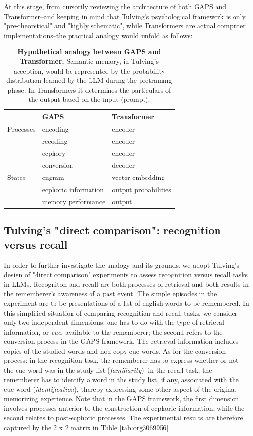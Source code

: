 \documentclass[11pt]{article}
\begin{document}
At this stage, from cursorily reviewing the architecture of both GAPS and Transformer--and keeping in mind that Tulving's psychological framework is only "pre-theoretical" and "highly schematic", while Transformers are actual computer implementations--the practical analogy would unfold as follows:

\begin{table}[htbp]
\caption{\label{tab:org3646b5e}\textbf{Hypothetical analogy between GAPS and Transformer.} Semantic memory, in Tulving's acception, would be represented by the probability distribution learned by the LLM during the pretraining phase. In Transformers it determines the particulars of the output based on the input (prompt).}
\centering
\begin{tabular}{lll}
 & GAPS & Transformer\\[0pt]
\hline
Processes & encoding & encoder\\[0pt]
 & recoding & encoder\\[0pt]
 & ecphory & encoder\\[0pt]
 & conversion & decoder\\[0pt]
\hline
States & engram & vector embedding\\[0pt]
 & ecphoric information & output probabilities\\[0pt]
 & memory performance & output\\[0pt]
\end{tabular}
\end{table}

\subsection*{Tulving's "direct comparison": recognition versus recall}
\label{sec:orgdc7f125}
In order to further investigate the analogy and its grounds, we adopt Tulving's design of "direct comparison" experiments to assess recognition versus recall tasks in LLMs. Recogniton and recall are both processes of retrieval and both results in the rememberer's awareness of a past event. The simple episodes in the experiment are to be presentations of a list of english words to be remembered. In this simplified situation of comparing recognition and recall tasks, we consider only two independent dimensions: one has to do with the type of retrieval information, or \emph{cue}, available to the rememberer; the second refers to the conversion process in the GAPS framework. The retrieval information includes copies of the studied words and non-copy cue words. As for the conversion process: in the recognition task, the rememberer has to express whether or not the cue word was in the study list (\emph{familiarity}); in the recall task, the rememberer has to identify a word in the study list, if any, associated with the cue word (\emph{identification}), thereby expressing some other aspect of the original memorizing experience. Note that in the GAPS framework, the first dimension involves processes anterior to the construction of ecphoric information, while the second relates to post-ecphoric processes. The experimental results are therefore captured by the 2 x 2 matrix in Table \ref{tab:org3069956}
\end{document}
